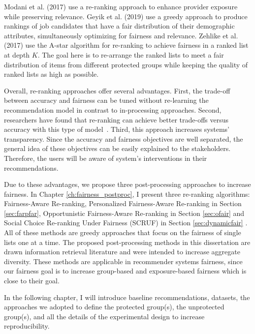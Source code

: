         Modani et al. (2017) \cite{modani2017fairness} use a re-ranking approach to enhance provider exposure while preserving relevance. Geyik et al. (2019) \cite{Geyik2019} use a greedy approach to produce rankings of job candidates that have a fair distribution of their demographic attributes, simultaneously optimizing for fairness and relevance. Zehlike et al. (2017) \cite{zehlike2017fa} use the A-star algorithm for re-ranking to achieve fairness in a ranked list at depth $K$. The goal here is to re-arrange the ranked lists to meet a fair distribution of items from different protected groups while keeping the quality of ranked lists as high as possible. 

        Overall, re-ranking approaches offer several advantages. First, the trade-off between accuracy and fairness can be tuned without re-learning the recommendation model in contrast to in-processing approaches. Second, researchers have found that re-ranking can achieve better trade-offs versus accuracy with this type of model~\cite{abdollahpouri2019managing,liu2019personalized}. Third, this approach increases systems' transparency. Since the accuracy and fairness objectives are well separated, the general idea of these objectives can be easily explained to the stakeholders. Therefore, the users will be aware of system's interventions in their recommendations.
        
        Due to these advantages, we propose three post-processing approaches to increase fairness. In Chapter \ref{ch:fairness_postproc}, I present three re-ranking algorithms: Fairness-Aware Re-ranking, Personalized Fairness-Aware Re-ranking in Section \ref{sec:farpfar}, Opportunistic Fairness-Aware Re-ranking in Section \ref{sec:ofair} and Social Choice Re-ranking Under Fairness (SCRUF) in Section \ref{sec:dynamicfair} . All of these methods are greedy approaches that focus on the fairness of single lists one at a time. The proposed post-processing methods in this dissertation are drawn information retrieval literature and were intended to increase aggregate diversity. These methods are applicable in recommender systems fairness, since our fairness goal is to increase group-based and exposure-based fairness which is close to their goal.
        
        
In the following chapter, I will introduce baseline recommendations, datasets, the approaches we adopted to define the protected group(s), the unprotected group(s), and all the details of the experimental design to increase reproducibility.